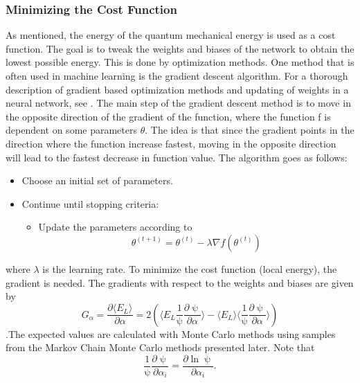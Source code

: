 \subsubsection{Minimizing the Cost Function}
As mentioned, the energy of the quantum mechanical energy is used as a cost function. The goal is to tweak the weights and biases of the network to obtain the lowest possible energy. This is done by optimization methods. One method that is often used in machine learning is the gradient descent algorithm. For a thorough description of gradient based optimization methods and updating of weights in a neural network, see \cite{4155}. The main step of the gradient descent method is to move in the opposite direction of the gradient of the function, where the function f is dependent on some parameters $\theta$. The idea is that since the gradient points in the direction where the function increase fastest, moving in the opposite direction will lead to the fastest decrease in function value. The algorithm goes as follows:
\begin{itemize}
    \item Choose an initial set of parameters.
    \item Continue until stopping criteria:
    \begin{itemize}
        \item Update the parameters according to 
        \begin{equation}
            \theta^{(t+1)} = \theta^{(t)} - \lambda \nabla f(\theta^{(t)})
            \label{gd}
        \end{equation}
    \end{itemize}
\end{itemize}
where $\lambda$ is the learning rate. 
To minimize the cost function (local energy), the gradient is needed. 
The gradients with respect to the weights and biases are given by
\begin{equation}
    G_{\alpha} = \frac{\partial \langle E_L \rangle}{\partial \alpha} = 2\left(\langle E_L \frac{1}{\uppsi}\frac{\partial \uppsi}{\partial \alpha}\rangle - \langle E_L \rangle \langle\frac{1}{\uppsi}\frac{\partial \uppsi}{\partial \alpha}\rangle  \right)
    \label{gradient}
\end{equation}
\cite{mhj_ml}
.The expected values are calculated with Monte Carlo methods using samples from the Markov Chain Monte Carlo methods presented later. Note that
\begin{equation}
    \frac{1}{\uppsi}\frac{\partial \uppsi}{\partial \alpha_i} = \frac{\partial \ln \uppsi}{\partial \alpha_i}.
\end{equation}
